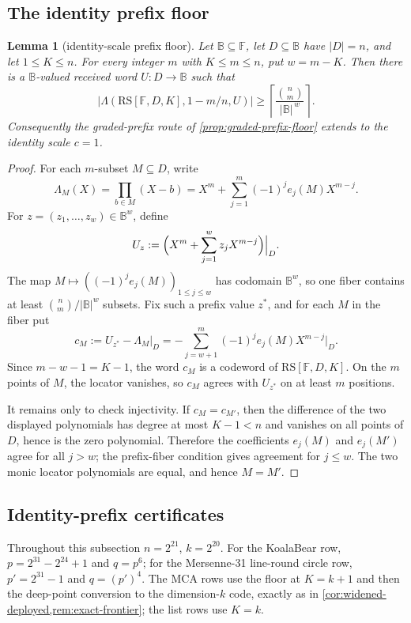 \documentclass[11pt]{article}
\newtheorem{lemma}[lemma]{Lemma}
\theoremstyle{definition}
\theoremstyle{remark}
\newcommand{\F}{\mathbb{F}}
\newcommand{\B}{\mathbb{B}}
\newcommand{\RS}{\mathrm{RS}}
\newcommand{\Lst}{\Lambda}
\begin{document}
\subsection{The identity prefix floor}

\begin{lemma}[identity-scale prefix floor]\label{lem:capff1-identity-prefix-floor}
Let $\B\subseteq\F$, let $D\subseteq\B$ have $|D|=n$, and let $1\le K\le n$.  For every integer $m$ with $K\le m\le n$, put $w=m-K$.  Then there is a $\B$-valued received word $U:D\to\B$ such that
\[
        \bigl|\Lst(\RS[\F,D,K],1-m/n,U)\bigr|
        \ge
        \left\lceil \frac{\binom n m}{|\B|^{\,w}}\right\rceil .
\]
Consequently the graded-prefix route of \cref{prop:graded-prefix-floor} extends to the identity scale $c=1$.
\end{lemma}

\begin{proof}
For each $m$-subset $M\subseteq D$, write
\[
        \Lambda_M(X)=\prod_{b\in M}(X-b)
        =X^m+\sum_{j=1}^{m}(-1)^j e_j(M)X^{m-j}.
\]
For $z=(z_1,\ldots,z_w)\in\B^w$, define
\[
        U_z:=\Bigl(X^m+\sum_{j=1}^{w}z_jX^{m-j}\Bigr)\Big|_D.
\]
The map $M\mapsto((-1)^je_j(M))_{1\le j\le w}$ has codomain $\B^w$, so one fiber contains at least $\binom nm/|\B|^w$ subsets.  Fix such a prefix value $z^*$, and for each $M$ in the fiber put
\[
        c_M:=U_{z^*}-\Lambda_M|_D
        =-\sum_{j=w+1}^{m}(-1)^je_j(M)X^{m-j}\Big|_D.
\]
Since $m-w-1=K-1$, the word $c_M$ is a codeword of $\RS[\F,D,K]$.  On the $m$ points of $M$, the locator vanishes, so $c_M$ agrees with $U_{z^*}$ on at least $m$ positions.

It remains only to check injectivity.  If $c_M=c_{M'}$, then the difference of the two displayed polynomials has degree at most $K-1<n$ and vanishes on all points of $D$, hence is the zero polynomial.  Therefore the coefficients $e_j(M)$ and $e_j(M')$ agree for all $j>w$; the prefix-fiber condition gives agreement for $j\le w$.  The two monic locator polynomials are equal, and hence $M=M'$.
\end{proof}

\subsection{Identity-prefix certificates}

Throughout this subsection $n=2^{21}$, $k=2^{20}$.  For the KoalaBear row, $p=2^{31}-2^{24}+1$ and $q=p^6$; for the Mersenne-31 line-round circle row, $p'=2^{31}-1$ and $q=(p')^4$.  The MCA rows use the floor at $K=k+1$ and then the deep-point conversion to the dimension-$k$ code, exactly as in \cref{cor:widened-deployed,rem:exact-frontier}; the list rows use $K=k$.
\end{document}
